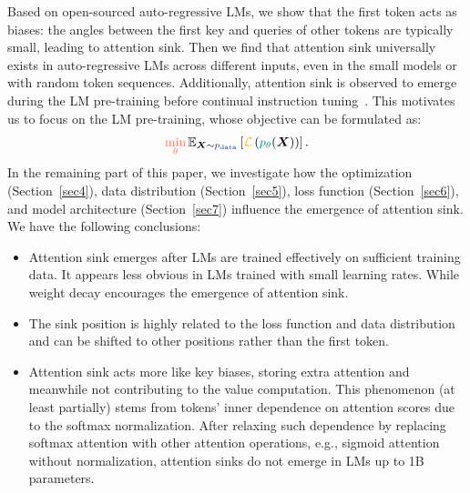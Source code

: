Based on open-sourced auto-regressive LMs, we show that the first token acts as biases: the angles between the first key and queries of other tokens are typically small, leading to attention sink. Then we find that attention sink universally exists in auto-regressive LMs across different inputs, even in the small models or with random token sequences. Additionally, attention sink is observed to emerge during the LM pre-training before continual instruction tuning~\citep{ouyang2022training}. This motivates us to focus on the LM pre-training, whose objective can be formulated as:
\begin{equation}
{\color{cc1}\min_{\theta}}\hspace{0.05cm}\mathbb{E}_{{\boldsymbol{X}\sim\color{cc2} p_{\textrm{data}}}}\left[{\color{cc3}\mathcal{L}}\left({\color{cc4}p_{\theta}}(\boldsymbol{X})\right)\right]\textrm{.}
\end{equation}
In the remaining part of this paper, we investigate how the {\color{cc1}optimization} (Section~\ref{sec4}), {\color{cc2}data distribution} (Section~\ref{sec5}), {\color{cc3}loss function} (Section~\ref{sec6}), and {\color{cc4}model architecture} (Section~\ref{sec7}) influence the emergence of attention sink. We have the following conclusions: 
\begin{itemize}
    \item Attention sink emerges after LMs are trained effectively on sufficient training data. It appears less obvious in LMs trained with small learning rates. While weight decay encourages the emergence of attention sink. 
    \item The sink position is highly related to the loss function and data distribution and can be shifted to other positions rather than the first token.  
    \item Attention sink acts more like key biases, storing extra attention and meanwhile not contributing to the value computation. This phenomenon (at least partially) stems from tokens' inner dependence on attention scores due to the softmax normalization. After relaxing such dependence by replacing softmax attention with other attention operations, e.g., sigmoid attention without normalization, attention sinks do not emerge in LMs up to 1B parameters.
\end{itemize}
 


